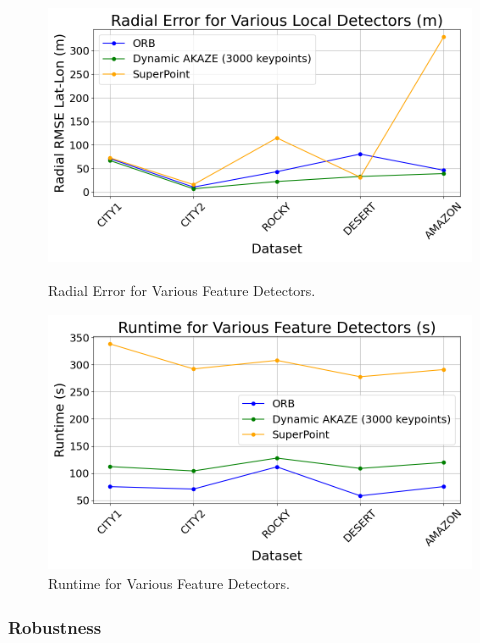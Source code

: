 \begin{figure}[H]
    \centering
    \begin{minipage}{0.45\textwidth}
        \centering
        \includegraphics[width=\textwidth]{./Chapter 4/testresults/rmse_detectors.png}
        \caption{Radial Error for Various Feature Detectors.}
        \label{fig:rmse_detectors}
    \end{minipage}\hfill
    \begin{minipage}{0.45\textwidth}
        \centering
        \includegraphics[width=\textwidth]{./Chapter 4/testresults/runtime_detectors.png}
        \caption{Runtime for Various Feature Detectors.}
        \label{fig:runtime_detectors}
    \end{minipage}
\end{figure}


\subsubsection*{Robustness}

